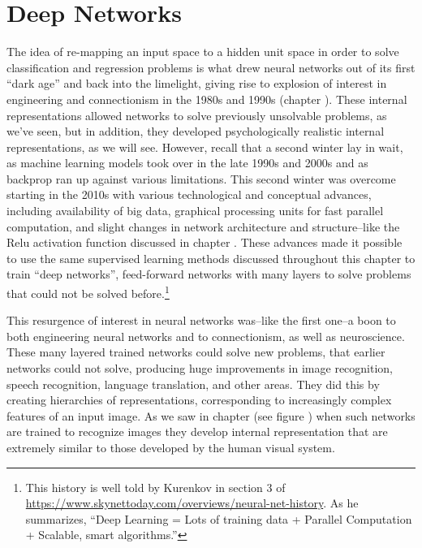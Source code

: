 \section{Deep Networks}\label{deepNets}


The idea of re-mapping an input space to a hidden unit space in order to solve classification and regression problems is what drew neural networks out of its first ``dark age'' and back into the limelight, giving rise to explosion of interest in engineering and connectionism in the 1980s and 1990s (chapter ). These internal representations allowed networks to  solve previously unsolvable problems, as we've seen, but in addition, they developed psychologically realistic internal representations, as we will see. However, recall that a second  winter lay in wait, as machine learning models took over in the late 1990s and 2000s and as backprop  ran up against various limitations. This second winter was overcome starting in the 2010s with various technological and conceptual advances, including availability of big data, graphical  processing units for  fast parallel computation, and slight changes in network architecture and structure--like the Relu activation function discussed in chapter . These advances made it possible to use the same supervised learning methods discussed throughout this chapter to train ``deep networks'', feed-forward networks with many layers to solve problems that could not be solved before.\footnote{This history is well told by Kurenkov in section 3 of \url{https://www.skynettoday.com/overviews/neural-net-history}. As he summarizes, ``Deep Learning = Lots of training data + Parallel Computation + Scalable, smart algorithms.''} 

This resurgence of interest  in neural networks was--like the first one--a boon to both engineering neural networks and to connectionism, as well as neuroscience. These many layered trained networks could solve new problems, that earlier networks could not solve, producing huge improvements in image recognition, speech recognition, language translation, and other areas. They did this by creating hierarchies of representations, corresponding  to increasingly complex features of an input image. As we saw in chapter  (see figure ) when such networks are trained to recognize images they develop internal representation that are extremely similar to those developed by the human visual  system.

